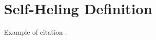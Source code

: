 \chapter{Self-Heling Definition}\label{ch:selfHelingDefinition}

Example of citation \cite{Ghosh:SelfHealingSurvey:2007}.